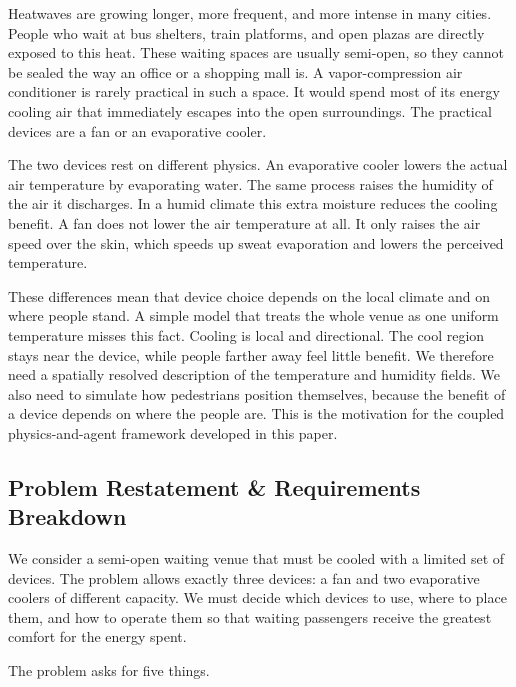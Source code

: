 \documentclass[11pt]{article}
\begin{document}
Heatwaves are growing longer, more frequent, and more intense in many cities. People who wait at bus shelters, train platforms, and open plazas are directly exposed to this heat. These waiting spaces are usually semi-open, so they cannot be sealed the way an office or a shopping mall is. A vapor-compression air conditioner is rarely practical in such a space. It would spend most of its energy cooling air that immediately escapes into the open surroundings. The practical devices are a fan or an evaporative cooler.

The two devices rest on different physics. An evaporative cooler lowers the actual air temperature by evaporating water. The same process raises the humidity of the air it discharges. In a humid climate this extra moisture reduces the cooling benefit. A fan does not lower the air temperature at all. It only raises the air speed over the skin, which speeds up sweat evaporation and lowers the perceived temperature.

These differences mean that device choice depends on the local climate and on where people stand. A simple model that treats the whole venue as one uniform temperature misses this fact. Cooling is local and directional. The cool region stays near the device, while people farther away feel little benefit. We therefore need a spatially resolved description of the temperature and humidity fields. We also need to simulate how pedestrians position themselves, because the benefit of a device depends on where the people are. This is the motivation for the coupled physics-and-agent framework developed in this paper.

\subsection{Problem Restatement \& Requirements Breakdown}

We consider a semi-open waiting venue that must be cooled with a limited set of devices. The problem allows exactly three devices: a fan and two evaporative coolers of different capacity. We must decide which devices to use, where to place them, and how to operate them so that waiting passengers receive the greatest comfort for the energy spent.

The problem asks for five things.
\end{document}
